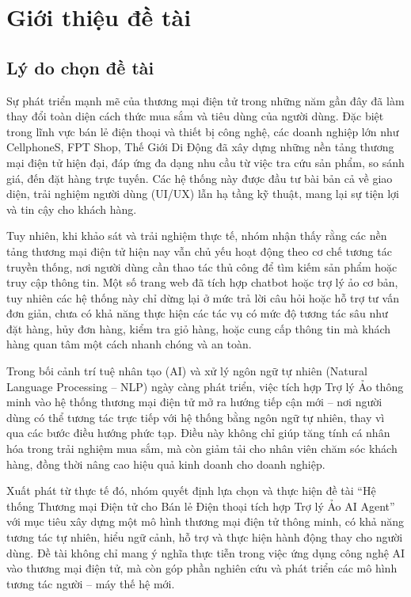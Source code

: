 \section{Giới thiệu đề tài}
\subsection{Lý do chọn đề tài}
Sự phát triển mạnh mẽ của thương mại điện tử trong những năm gần đây đã làm thay đổi toàn diện cách thức mua sắm và tiêu dùng của người dùng. Đặc biệt trong lĩnh vực bán lẻ điện thoại và thiết bị công nghệ, các doanh nghiệp lớn như CellphoneS, FPT Shop, Thế Giới Di Động đã xây dựng những nền tảng thương mại điện tử hiện đại, đáp ứng đa dạng nhu cầu từ việc tra cứu sản phẩm, so sánh giá, đến đặt hàng trực tuyến. Các hệ thống này được đầu tư bài bản cả về giao diện, trải nghiệm người dùng (UI/UX) lẫn hạ tầng kỹ thuật, mang lại sự tiện lợi và tin cậy cho khách hàng.

Tuy nhiên, khi khảo sát và trải nghiệm thực tế, nhóm nhận thấy rằng các nền tảng thương mại điện tử hiện nay vẫn chủ yếu hoạt động theo cơ chế tương tác truyền thống, nơi người dùng cần thao tác thủ công để tìm kiếm sản phẩm hoặc truy cập thông tin. Một số trang web đã tích hợp chatbot hoặc trợ lý ảo cơ bản, tuy nhiên các hệ thống này chỉ dừng lại ở mức trả lời câu hỏi hoặc hỗ trợ tư vấn đơn giản, chưa có khả năng thực hiện các tác vụ có mức độ tương tác sâu như đặt hàng, hủy đơn hàng, kiểm tra giỏ hàng, hoặc cung cấp thông tin mà khách hàng quan tâm một cách nhanh chóng và an toàn.

Trong bối cảnh trí tuệ nhân tạo (AI) và xử lý ngôn ngữ tự nhiên (Natural Language Processing – NLP) ngày càng phát triển, việc tích hợp Trợ lý Ảo thông minh vào hệ thống thương mại điện tử mở ra hướng tiếp cận mới – nơi người dùng có thể tương tác trực tiếp với hệ thống bằng ngôn ngữ tự nhiên, thay vì qua các bước điều hướng phức tạp. Điều này không chỉ giúp tăng tính cá nhân hóa trong trải nghiệm mua sắm, mà còn giảm tải cho nhân viên chăm sóc khách hàng, đồng thời nâng cao hiệu quả kinh doanh cho doanh nghiệp.

Xuất phát từ thực tế đó, nhóm quyết định lựa chọn và thực hiện đề tài “Hệ thống Thương mại Điện tử cho Bán lẻ Điện thoại tích hợp Trợ lý Ảo AI Agent” với mục tiêu xây dựng một mô hình thương mại điện tử thông minh, có khả năng tương tác tự nhiên, hiểu ngữ cảnh, hỗ trợ và thực hiện hành động thay cho người dùng. Đề tài không chỉ mang ý nghĩa thực tiễn trong việc ứng dụng công nghệ AI vào thương mại điện tử, mà còn góp phần nghiên cứu và phát triển các mô hình tương tác người – máy thế hệ mới.


